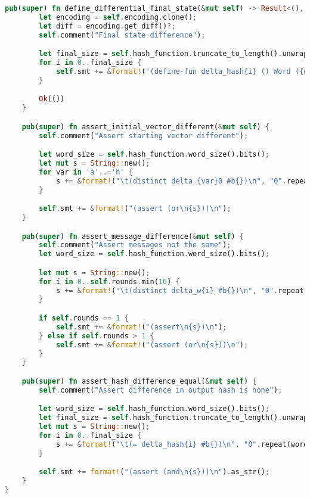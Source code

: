 \begin{lstlisting}[language=rust, caption={smt\_lib/encodings/differential\_shared.rs}]
	pub(super) fn define_differential_final_state(&mut self) -> Result<(), Box<dyn Error>> {
		let encoding = self.encoding.clone();
		let diff = encoding.get_diff()?;
		self.comment("Final state difference");

		let final_size = self.hash_function.truncate_to_length().unwrap_or(8);
		for i in 0..final_size {
			self.smt += &format!("(define-fun delta_hash{i} () Word ({diff} m0_hash{i} m1_hash{i}))\n");
		}

		Ok(())
	}

	pub(super) fn assert_initial_vector_different(&mut self) {
		self.comment("Assert starting vector different");

		let word_size = self.hash_function.word_size().bits();
		let mut s = String::new();
		for var in 'a'..='h' {
			s += &format!("\t(distinct delta_{var}0 #b{})\n", "0".repeat(word_size));
		}

		self.smt += &format!("(assert (or\n{s}))\n");
	}

	pub(super) fn assert_message_difference(&mut self) {
		self.comment("Assert messages not the same");
		let word_size = self.hash_function.word_size().bits();

		let mut s = String::new();
		for i in 0..self.rounds.min(16) {
			s += &format!("\t(distinct delta_w{i} #b{})\n", "0".repeat(word_size));
		}

		if self.rounds == 1 {
			self.smt += &format!("(assert\n{s})\n");
		} else if self.rounds > 1 {
			self.smt += &format!("(assert (or\n{s}))\n");
		}
	}

	pub(super) fn assert_hash_difference_equal(&mut self) {
		self.comment("Assert difference in output hash is none");

		let word_size = self.hash_function.word_size().bits();
		let final_size = self.hash_function.truncate_to_length().unwrap_or(8);
		let mut s = String::new();
		for i in 0..final_size {
			s += &format!("\t(= delta_hash{i} #b{})\n", "0".repeat(word_size));
		}

		self.smt += format!("(assert (and\n{s}))\n").as_str();
	}
}
\end{lstlisting}

